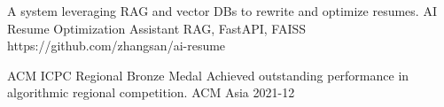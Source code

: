 \documentclass[]{awesome-cv}
\begin{document}
\vspace{-7mm}


\begin{cventries}
    	\cventry
	{ A system leveraging RAG and vector DBs to rewrite and optimize resumes. }
	{ AI Resume Optimization Assistant }
	{        {RAG, FastAPI, FAISS } 
    }
	{ https://github.com/zhangsan/ai{-}resume }
	{}
	
	\vspace{-5mm}
    \end{cventries}


\begin{cvhonors}
    	\cvhonor
	{ACM ICPC Regional Bronze Medal}
	{Achieved outstanding performance in algorithmic regional competition.}
	{ACM Asia}
	{2021{-}12}
    \end{cvhonors}

\
\end{document}
